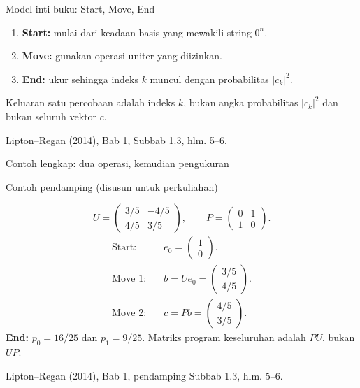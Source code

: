 \documentclass[aspectratio=169,11pt]{beamer}
\newcommand{\bookref}[1]{\par\vfill{\scriptsize\color{gray}Lipton--Regan (2014), Bab 1, #1.}}
\newcommand{\extra}{\par\textcolor{AcademicBlue}{\small Contoh pendamping (disusun untuk perkuliahan)}\par}
\begin{document}
\begin{frame}{Model inti buku: Start, Move, End}

\begin{center}
\end{center}
\begin{enumerate}
\item \textbf{Start:} mulai dari keadaan basis yang mewakili string $0^n$.
\item \textbf{Move:} gunakan operasi uniter yang diizinkan.
\item \textbf{End:} ukur sehingga indeks $k$ muncul dengan probabilitas $|c_k|^2$.
\end{enumerate}
Keluaran satu percobaan adalah indeks $k$, bukan angka probabilitas $|c_k|^2$ dan bukan seluruh vektor $c$.
\bookref{Subbab 1.3, hlm. 5--6}

\end{frame}

\begin{frame}{Contoh lengkap: dua operasi, kemudian pengukuran}
\small

\extra
\[
 U=\begin{pmatrix}3/5&-4/5\\4/5&3/5\end{pmatrix},\qquad
 P=\begin{pmatrix}0&1\\1&0\end{pmatrix}.
\]
\begin{align*}
 \text{Start:}\quad & e_0=\begin{pmatrix}1\\0\end{pmatrix}.\\
 \text{Move 1:}\quad & b=Ue_0=\begin{pmatrix}3/5\\4/5\end{pmatrix}.\\
 \text{Move 2:}\quad & c=Pb=\begin{pmatrix}4/5\\3/5\end{pmatrix}.
\end{align*}
\textbf{End:} $p_0=16/25$ dan $p_1=9/25$. Matriks program keseluruhan adalah $PU$, bukan $UP$.
\bookref{pendamping Subbab 1.3, hlm. 5--6}

\end{frame}
\end{document}
